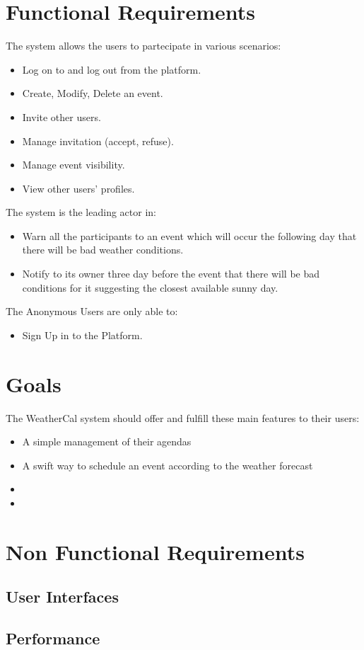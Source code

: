 \section{Functional Requirements}
The system allows the users to partecipate in various scenarios:
\begin{itemize}
\item Log on to and log out from the platform.
\item Create, Modify, Delete an event.
\item Invite other users.
\item Manage invitation (accept, refuse).
\item Manage event visibility.
\item View other users' profiles.
\end{itemize}
The system is the leading actor in:
\begin{itemize}
\item {Warn all the participants to an event which will occur the following day that there will be bad weather conditions.} 
\item Notify to its owner three day before the event that there will be bad conditions for it suggesting the closest available sunny day.
\end{itemize}
The Anonymous Users are only able to:
\begin{itemize}
\item Sign Up in to the Platform.
\end{itemize}
\section {Goals}
The WeatherCal system should offer and fulfill these main features to their users:
\begin{itemize}
\item A simple management of their agendas
\item A swift way to schedule an event according to the weather forecast 
\item 
\item 
\end{itemize}
\section{Non Functional Requirements}
\subsection{User Interfaces}
\subsection{Performance}
